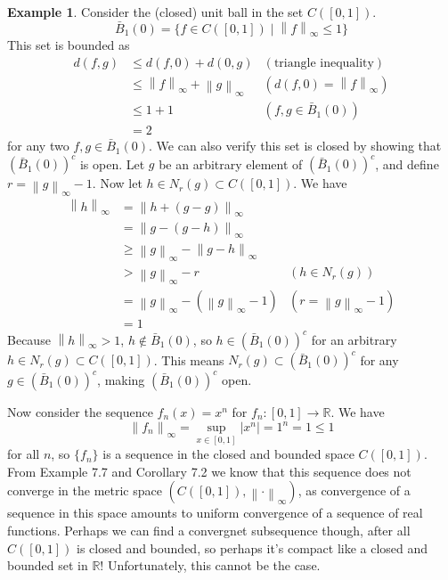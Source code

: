 \documentclass{article}
\newcommand{\R}{\mathbb{R}}
\newcommand{\norm}[1]{\left\lVert#1\right\rVert}
\newcommand{\abs}[1]{\left\lvert#1\right\rvert}
\theoremstyle{definition}
\newtheorem{example}{Example}[section]
\begin{document}
	\begin{example}
		Consider the (closed) unit ball in the set $C([0,1])$. 
		$$ \bar B_1(0)=\{f\in C([0,1]) \mid \norm{f}_\infty \le 1 \}$$
		This set is bounded as 
		\begin{align*}
			d(f,g) & \le d(f,0) + d(0,g) & (\text{triangle inequality})\\
			& \le \norm{f}_\infty + \norm{g}_\infty  & (d(f,0) = \norm{f}_\infty)\\
			& \le 1 + 1 & (f,g\in  \bar B_1(0))\\
			& = 2
		\end{align*}
	for any two $f,g \in  \bar B_1(0)$. We can also verify this set is closed by showing that $(\bar B_1(0))^c$ is open. Let $g$  be an arbitrary element of $(\bar B_1(0))^c$, and define $r = \norm{g}_\infty - 1$. Now let $h \in N_r(g)\subset C([0,1])$. We have 
	\begin{align*}
		\norm{h}_\infty & = \norm{h + (g-g)}_\infty\\
		& = \norm{g - (g-h)}_\infty\\
		& \ge \norm{g}_\infty - \norm{g-h}_\infty\\
		& > \norm{g}_\infty - r & (h \in N_r(g))\\
		& = \norm{g}_\infty - (\norm{g}_\infty - 1) & (r = \norm{g}_\infty - 1)\\
		& = 1
	\end{align*}
	Because $\norm{h}_\infty > 1$, $h\notin \bar B_1(0)$, so $h\in (\bar B_1(0))^c$ for an arbitrary $h \in N_r(g)\subset C([0,1])$. This means $N_r(g)\subset (\bar B_1(0))^c$ for any $g\in (\bar B_1(0))^c$, making $ (\bar B_1(0))^c $ open.
	
	Now consider the sequence $f_n(x)=x^n$ for $f_n:[0,1]\to \R$. We have 
	$$ \norm{f_n}_\infty = \sup_{x\in[0,1]}\abs{x^n} = 1^n = 1 \le 1$$ for all $n$, so $\{f_n\}$ is a sequence in the closed and bounded space $C([0,1])$.  From Example 7.7 and Corollary 7.2 we know that this sequence does not converge in the metric space $(C([0,1]), \norm{\cdot}_\infty)$, as convergence of a sequence in this space amounts to uniform convergence of a sequence of real functions. Perhaps we can find a convergnet subsequence though, after all $C([0,1])$ is closed and bounded, so perhaps it's compact like a closed and bounded set in $\R$! Unfortunately, this cannot be the case. 
	

\end{example}
\end{document}
